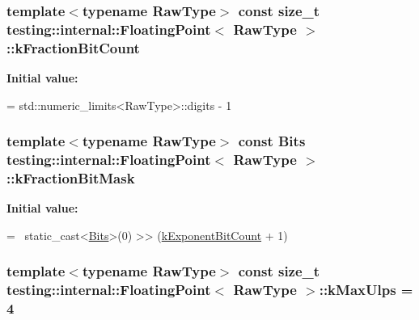 \hypertarget{classtesting_1_1internal_1_1FloatingPoint_a0b756a6d2a4f5f5b41ca79651c06c043}{
\subsubsection[{k\-Fraction\-Bit\-Count}]{\setlength{\rightskip}{0pt plus 5cm}template$<$typename Raw\-Type$>$ const size\-\_\-t {\bf testing\-::internal\-::\-Floating\-Point}$<$ Raw\-Type $>$\-::k\-Fraction\-Bit\-Count\hspace{0.3cm}{\ttfamily [static]}}}\label{classtesting_1_1internal_1_1FloatingPoint_a0b756a6d2a4f5f5b41ca79651c06c043}
{\bfseries Initial value\-:}
\begin{DoxyCode}
=
    std::numeric\_limits<RawType>::digits - 1
\end{DoxyCode}
\hypertarget{classtesting_1_1internal_1_1FloatingPoint_a0ac75d4ffd24f14bca452abe8a718da1}{
\subsubsection[{k\-Fraction\-Bit\-Mask}]{\setlength{\rightskip}{0pt plus 5cm}template$<$typename Raw\-Type$>$ const {\bf Bits} {\bf testing\-::internal\-::\-Floating\-Point}$<$ Raw\-Type $>$\-::k\-Fraction\-Bit\-Mask\hspace{0.3cm}{\ttfamily [static]}}}\label{classtesting_1_1internal_1_1FloatingPoint_a0ac75d4ffd24f14bca452abe8a718da1}
{\bfseries Initial value\-:}
\begin{DoxyCode}
=
    ~static\_cast<\hyperlink{classtesting_1_1internal_1_1FloatingPoint_abf228bf6cd48f12c8b44c85b4971a731}{Bits}>(0) >> (\hyperlink{classtesting_1_1internal_1_1FloatingPoint_a1973d843c00781053d3073daa8a40119}{kExponentBitCount} + 1)
\end{DoxyCode}
\hypertarget{classtesting_1_1internal_1_1FloatingPoint_aac498b3714d93f8e88cdc30e4c5935f6}{
\subsubsection[{k\-Max\-Ulps}]{\setlength{\rightskip}{0pt plus 5cm}template$<$typename Raw\-Type$>$ const size\-\_\-t {\bf testing\-::internal\-::\-Floating\-Point}$<$ Raw\-Type $>$\-::k\-Max\-Ulps = 4\hspace{0.3cm}{\ttfamily [static]}}}\label{classtesting_1_1internal_1_1FloatingPoint_aac498b3714d93f8e88cdc30e4c5935f6}
